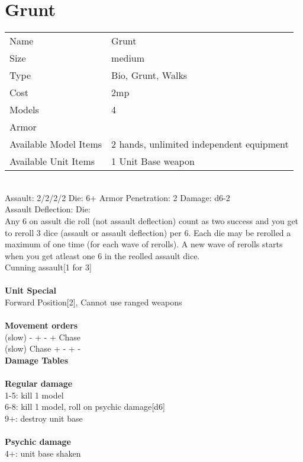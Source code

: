 \pagebreak

\section{ Grunt }

\begin{tabular}{ll}
  Name & Grunt \\
  Size & medium\\
  Type & Bio, Grunt, Walks\\
  Cost & 2mp\\
  Models & 4\\
  Armor & \\
  Available Model Items & 2 hands, unlimited independent equipment \\
  Available Unit Items & 1 Unit Base weapon \\
\end{tabular}

\ \\
Assault: 2/2/2/2 Die: 6+ Armor Penetration: 2 Damage: d6-2 \\
Assault Deflection:  Die: \\
\indent Any 6 on assult die roll (not assault deflection) count as two success and you get to reroll 3 dice (assault or assault deflection) per 6. Each die may be rerolled a maximum of one time (for each wave of rerolls). A new wave of rerolls starts when you get atleast one 6 in the reolled assault dice.\\ Cunning assault[1 for 3] \\
\ \\

{\bf Unit Special} \\
Forward Position[2], Cannot use ranged weapons
\ \\


\ \\ {\bf Movement orders } \\
(slow) - + - + Chase \\
(slow) Chase + - + - \\



{\bf Damage Tables} \\
\ \\ {\bf Regular damage } \\
1-5: kill 1 model \\
6-8: kill 1 model, roll on psychic damage[d6] \\
9+: destroy unit base \\
\ \\ {\bf Psychic damage } \\
4+: unit base shaken \\


